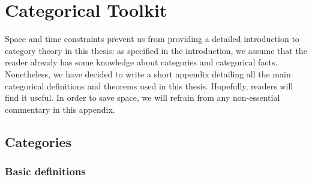\documentclass[11pt,a4paper,openright,twoside]{report}
\theoremstyle{plain}
\theoremstyle{definition}
\begin{document}













{\footnotesize }



\clearpage{\pagestyle{empty}\cleardoublepage}




\appendix
\chapter{Categorical Toolkit}



Space and time constraints prevent us from providing a detailed introduction to category theory in this thesis: as specified in the introduction, we assume that the reader already has some knowledge about categories and categorical facts.
Nonetheless, we have decided to write a short appendix detailing all the main categorical definitions and theorems used in this thesis. Hopefully, readers will find it useful. In order to save space, we will refrain from any non-essential commentary in this appendix.






\section{Categories}

\subsection{Basic definitions}
\end{document}
